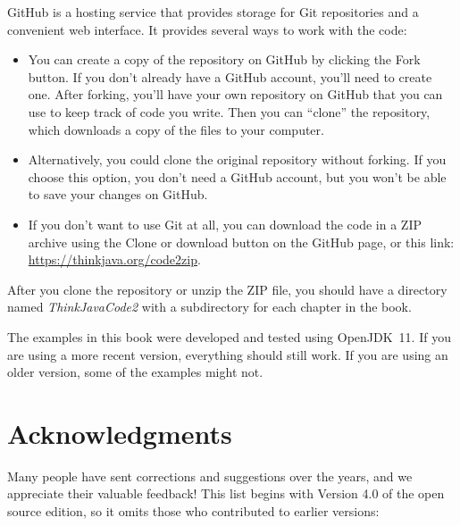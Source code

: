 
GitHub is a hosting service that provides storage for Git repositories and a convenient web interface.
It provides several ways to work with the code:

\begin{itemize}

\item You can create a copy of the repository on GitHub by clicking the {\sf Fork} button.
If you don't already have a GitHub account, you'll need to create one.
After forking, you'll have your own repository on GitHub that you can use to keep track of code you write.
Then you can ``clone'' the repository, which downloads a copy of the files to your computer.

\item Alternatively, you could clone the original repository without forking.
If you choose this option, you don't need a GitHub account, but you won't be able to save your changes on GitHub.

\item If you don't want to use Git at all, you can download the code in a ZIP archive using the {\sf Clone or download} button on the GitHub page, or this link: \url{https://thinkjava.org/code2zip}.

\end{itemize}

After you clone the repository or unzip the ZIP file, you should have a directory named {\it ThinkJavaCode2} with a subdirectory for each chapter in the book.

The examples in this book were developed and tested using OpenJDK~11.
If you are using a more recent version, everything should still work.
If you are using an older version, some of the examples might not.


\section*{Acknowledgments}

Many people have sent corrections and suggestions over the years, and we appreciate their valuable feedback!
This list begins with Version 4.0 of the open source edition, so it omits those who contributed to earlier versions:


